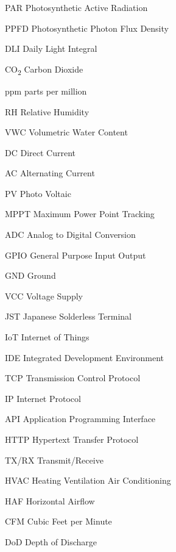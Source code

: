 \begin{Nomencl}[1cm]
 

    \item[PAR] Photosynthetic Active Radiation
    \item[PPFD] Photosynthetic Photon Flux Density
    \item[DLI] Daily Light Integral
    \item[CO\textsubscript{2}] Carbon Dioxide
    \item[ppm] parts per million
    \item[RH] Relative Humidity
    \item[VWC] Volumetric Water Content
    \item[DC] Direct Current
    \item[AC] Alternating Current
    \item[PV] Photo Voltaic
    \item[MPPT] Maximum Power Point Tracking
    \item[ADC] Analog to Digital Conversion
    \item[GPIO] General Purpose Input Output
    \item[GND] Ground
    \item[VCC] Voltage Supply
    \item[JST] Japanese Solderless Terminal
    \item[IoT] Internet of Things
    \item[IDE] Integrated Development Environment
    \item[TCP] Transmission Control Protocol
    \item[IP] Internet Protocol
    \item[API] Application Programming Interface
    \item[HTTP] Hypertext Transfer Protocol
    \item[TX/RX] Transmit/Receive
    \item[HVAC] Heating Ventilation Air Conditioning
    \item[HAF] Horizontal Airflow
    \item[CFM] Cubic Feet per Minute
    \item[DoD] Depth of Discharge
    
    
    

\end{Nomencl}
